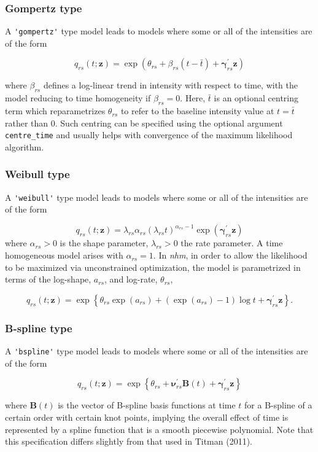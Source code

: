 \documentclass{article}
\numberwithin{equation}{section}
\begin{document}
\subsubsection*{Gompertz type}

A \verb!'gompertz'! type model leads to models where some or all of the intensities are of the form

$$q_{rs}(t ; \mathbf{z}) = \exp( \theta_{rs} + \beta_{rs}(t - \bar{t}) + \bm\gamma_{rs}^{'}\mathbf{z})$$

where $\beta_{rs}$ defines a log-linear trend in intensity with respect to time, with the model reducing to time homogeneity if $\beta_{rs}=0$. Here, $\bar{t}$ is an optional centring term which reparametrizes $\theta_{rs}$ to refer to the baseline intensity value at $t = \bar{t}$ rather than 0. Such centring can be specified using the optional argument \verb!centre_time! and usually helps with convergence of the maximum likelihood algorithm.

\subsubsection*{Weibull type}

A \verb!'weibull'! type model leads to models where some or all of the intensities are of the form

$$q_{rs}(t ; \mathbf{z}) = \lambda_{rs} \alpha_{rs} (\lambda_{rs} t)^{\alpha_{rs} - 1} \exp(\bm\gamma_{rs}^{'}\mathbf{z})$$
where $\alpha_{rs} >0$ is the shape parameter, $\lambda_{rs} > 0$ the rate parameter. A time homogeneous model arises with $\alpha_{rs} = 1$. 
In {\it nhm}, in order to allow the likelihood to be maximized via unconstrained optimization, the model is parametrized in terms of the log-shape, $a_{rs}$, and log-rate, $\theta_{rs}$,

$$q_{rs}(t ; \mathbf{z}) = \exp\left\{ \theta_{rs} \exp(a_{rs}) + (\exp(a_{rs}) - 1)\log t  +\bm\gamma_{rs}^{'}\mathbf{z}\right\}.$$

\subsubsection*{B-spline type}

A \verb!'bspline'! type model leads to models where some or all of the intensities are of the form

$$q_{rs}(t ; \mathbf{z}) = \exp\left\{ \theta_{rs} + \bm\nu_{rs}^{'}\mathbf{B}(t) +\bm\gamma_{rs}^{'}\mathbf{z}\right\}$$

where $\mathbf{B}(t)$ is the vector of B-spline basis functions at time $t$ for a B-spline of a certain order with certain knot points, implying the overall effect of time is represented by a spline function that is a smooth piecewise polynomial. Note that this specification differs slightly from that used in Titman (2011).
\end{document}
